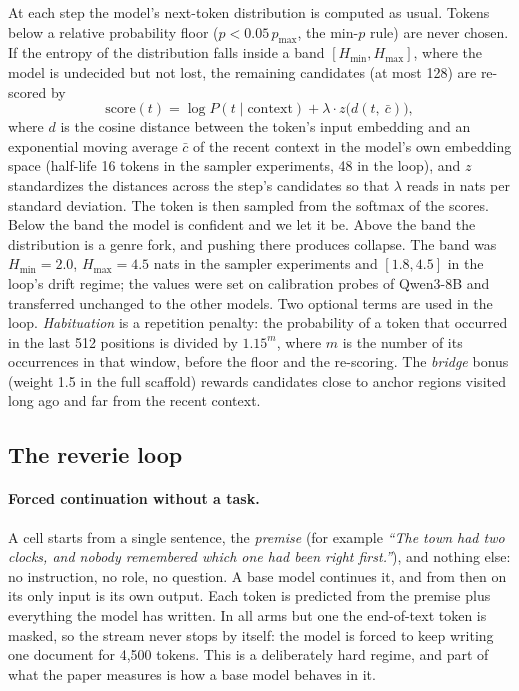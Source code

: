 At each step the model's next-token distribution is computed as usual.
Tokens below a relative probability floor ($p < 0.05\,p_{\max}$, the min-$p$
rule) are never chosen. If the entropy of the distribution falls inside a
band $[H_{\min}, H_{\max}]$, where the model is undecided but not lost, the
remaining candidates (at most 128) are re-scored by
\[
\text{score}(t) = \log P(t \mid \text{context}) + \lambda \cdot z\!\big(d(t,\ \bar{c})\big),
\]
where $d$ is the cosine distance between the token's input embedding and an
exponential moving average $\bar c$ of the recent context in the model's own
embedding space (half-life 16 tokens in the sampler experiments, 48 in the
loop), and $z$ standardizes the distances across the step's candidates so
that $\lambda$ reads in nats per standard deviation. The token is then
sampled from the softmax of the scores. Below the band the model is
confident and we let it be. Above the band the distribution is a genre fork,
and pushing there produces collapse. The band was $H_{\min}=2.0$,
$H_{\max}=4.5$ nats in the sampler experiments and $[1.8, 4.5]$ in the
loop's drift regime; the values were set on calibration probes of Qwen3-8B
and transferred unchanged to the other models. Two optional terms are used
in the loop. \emph{Habituation} is a repetition penalty: the probability of
a token that occurred in the last 512 positions is divided by $1.15^{m}$,
where $m$ is the number of its occurrences in that window, before the floor
and the re-scoring. The \emph{bridge} bonus (weight 1.5 in the full
scaffold) rewards candidates close to anchor regions visited long ago and
far from the recent context.

\subsection{The reverie loop}
\label{sec:loop-method}

\paragraph{Forced continuation without a task.} A cell starts from a single
sentence, the \emph{premise} (for example \emph{``The town had two clocks,
and nobody remembered which one had been right first.''}), and nothing
else: no instruction, no role, no question. A base model continues it, and
from then on its only input is its own output. Each token is predicted from
the premise plus everything the model has written. In all arms but one the
end-of-text token is masked, so the stream never stops by itself: the model
is forced to keep writing one document for 4,500 tokens. This is a
deliberately hard regime, and part of what the paper measures is how a base
model behaves in it.

